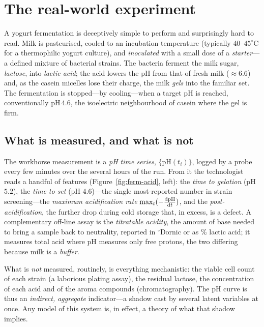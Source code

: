 \section{The real-world experiment}
\label{sec:ferm-lab}

A yogurt fermentation is deceptively simple to perform and surprisingly hard to
read. Milk is pasteurised, cooled to an incubation temperature (typically
$40$--$45^\circ$C for a thermophilic yogurt culture), and \emph{inoculated} with a
small dose of a \emph{starter}---a defined mixture of bacterial strains. The
bacteria ferment the milk sugar, \emph{lactose}, into \emph{lactic acid}; the acid
lowers the pH from that of fresh milk ($\approx 6.6$) and, as the casein micelles
lose their charge, the milk \emph{gels} into the familiar set. The fermentation is
stopped---by cooling---when a target pH is reached, conventionally $\mathrm{pH}\,
4.6$, the isoelectric neighbourhood of casein where the gel is firm.

\subsection{What is measured, and what is not}

The workhorse measurement is a \emph{pH time series}, $\{\mathrm{pH}(t_i)\}$,
logged by a probe every few minutes over the several hours of the run. From it the
technologist reads a handful of features (Figure~\ref{fig:ferm-acid}, left): the
\emph{time to gelation} (pH $5.2$), the \emph{time to set} (pH $4.6$)---the single
most-reported number in strain screening---the \emph{maximum acidification rate}
$\max_t(-\frac{\mathrm{d} \mathrm{pH}}{\mathrm{d} t})$, and the \emph{post-acidification}, the further
drop during cold storage that, in excess, is a defect. A complementary off-line
assay is the \emph{titratable acidity}, the amount of base needed to bring a
sample back to neutrality, reported in $^\circ$Dornic or as \% lactic acid; it
measures total acid where pH measures only free protons, the two differing because
milk is a \emph{buffer}.

What is \emph{not} measured, routinely, is everything mechanistic: the viable cell
count of each strain (a laborious plating assay), the residual lactose, the
concentration of each acid and of the aroma compounds (chromatography). The pH
curve is thus an \emph{indirect, aggregate} indicator---a shadow cast by several
latent variables at once. Any model of this system is, in effect, a theory of what
that shadow implies.

